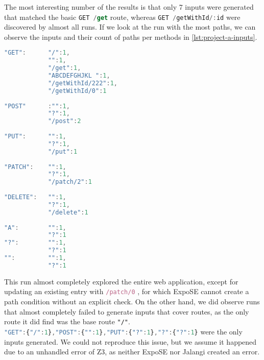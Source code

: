 The most interesting number of the results is that only 7 inputs were generated that matched the basic \lstinline[language=JavaScript]{GET /get} 
route, whereas \lstinline[language=JavaScript]{GET /getWithId/:id} were discovered by almost all runs. 
If we look at the run with the most paths, we can observe the inputs and their count of paths per methods in \autoref{lst:project-a-inputs}.
\begin{lstlisting}[language=JavaScript, float, label={lst:project-a-inputs}, caption={[Generated Inputs for Project A]The inputs generated for project A, listed by the HTTP method, grouped by the router.}]
"GET":      "/":1, 
            "":1, 
            "/get":1, 
            "ABCDEFGHJKL ":1,
            "/getWithId/222":1,
            "/getWithId/0":1
            
"POST"      :"":1,
            "?":1,
            "/post":2
            
"PUT":      "":1, 
            "?":1, 
            "/put":1
            
"PATCH":    "":1, 
            "?":1, 
            "/patch/2":1
            
"DELETE":   "":1, 
            "?":1, 
            "/delete":1
            
"A":        "":1,
            "?":1
"?":        "":1,
            "?":1
"":         "":1,
            "?":1
\end{lstlisting}
This run almost completely explored the entire web application, except for updating an existing entry with 
\lstinline[language=JavaScript]+/patch/0+
, for which ExpoSE cannot create a path condition without an explicit check. 
On the other hand, we did observe runs that almost completely failed to generate inputs that cover routes, as the only route it did find was the base route \lstinline+"/"+.\\
\lstinline[language=JavaScript]+"GET":{"/":1},"POST":{"":1},"PUT":{"?":1},"?":{"?":1}+ were the only inputs generated. 
We could not reproduce this issue, but we assume it happened due to an unhandled error of Z3, as neither ExpoSE nor Jalangi created an error. 

